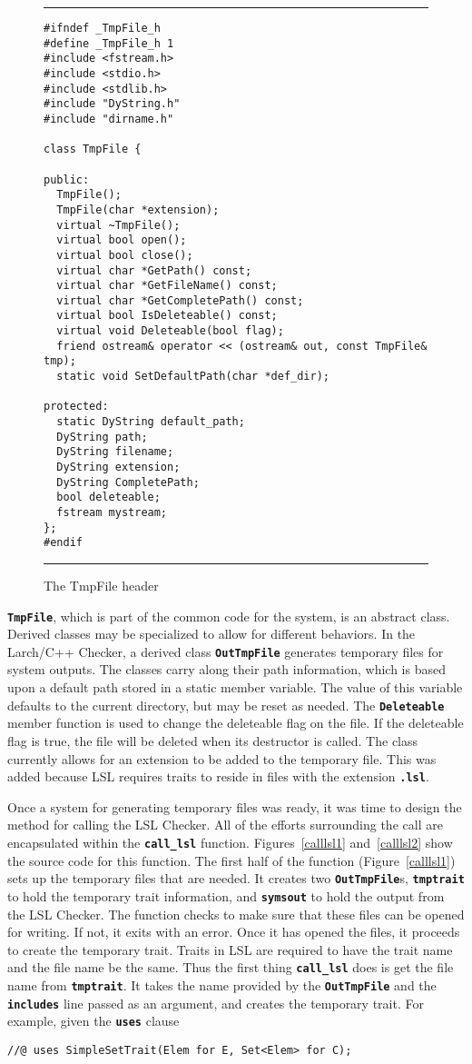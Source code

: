 \documentclass[12pt]{article} %
\newcommand{\reserved}[1]{\textbf{\texttt{#1}}} %
\newcommand{\UNSPACEFORBOX}{\vspace{-2ex}}
\newcommand{\HLINE}{\UNSPACEFORBOX%
\begin{flushleft}\rule{\textwidth}{0.01in}\end{flushleft}%
\UNSPACEFORBOX}
\newenvironment{BFIGURE}{

\begin{figure}
\small
\HLINE
}{
\HLINE
\normalsize
\end{figure}
}
\begin{document}
\begin{BFIGURE}
\begin{verbatim}
#ifndef _TmpFile_h
#define _TmpFile_h 1
#include <fstream.h>
#include <stdio.h>
#include <stdlib.h>
#include "DyString.h"
#include "dirname.h"

class TmpFile {

public:
  TmpFile();
  TmpFile(char *extension);
  virtual ~TmpFile();
  virtual bool open();
  virtual bool close();
  virtual char *GetPath() const;
  virtual char *GetFileName() const;
  virtual char *GetCompletePath() const;
  virtual bool IsDeleteable() const;
  virtual void Deleteable(bool flag);
  friend ostream& operator << (ostream& out, const TmpFile& tmp);
  static void SetDefaultPath(char *def_dir);

protected:
  static DyString default_path;
  DyString path;
  DyString filename;
  DyString extension;
  DyString CompletePath;
  bool deleteable;
  fstream mystream;
};
#endif
\end{verbatim}
\caption{The TmpFile header}
\label{tmpfile}
\end{BFIGURE}
\reserved{TmpFile}, which is part of the common code for the system, is an
abstract class. Derived classes may be specialized to allow for
different behaviors. In the Larch/C++ Checker, a derived class
\reserved{OutTmpFile} generates temporary files for system outputs. The classes
carry along their path information, which is based upon a default path
stored in a static member variable. The value of this variable defaults to
the current directory, but may be reset as needed. The \reserved{Deleteable}
member function is used to change the deleteable flag on the file. If
the deleteable flag is true, the file will be deleted when its
destructor is called. The class currently allows for an extension to
be added to the temporary file. This was added because LSL requires
traits to reside in files with the extension
\reserved{.lsl}.

Once a system for generating temporary files was ready, it was time to
design the method for calling the LSL Checker. All of the efforts
surrounding the call are encapsulated within the \reserved{call\_lsl}
function. Figures~\ref{calllsl1} and~\ref{calllsl2} show the source
code for this function. The first half of the function
(Figure~\ref{calllsl1}) sets up the temporary files that are needed. It creates
two \reserved{OutTmpFile}s, \reserved{tmptrait} to hold the temporary trait information, and
\reserved{symsout} to hold the output from the LSL Checker. The function checks
to make sure that these files can be opened for writing. If not, it
exits with an error. Once it has opened the files, it proceeds to
create the temporary trait. Traits in LSL are required to have the
trait name and the file name be the same. Thus the first thing
\reserved{call\_lsl} does is get the file name from
\reserved{tmptrait}. It takes the name provided by the
\reserved{OutTmpFile} and the \reserved{includes} line 
passed as an argument, and creates the temporary trait. For example,
given the \reserved{uses} clause
\begin{verbatim}
//@ uses SimpleSetTrait(Elem for E, Set<Elem> for C);
\end{verbatim}
\end{document}

